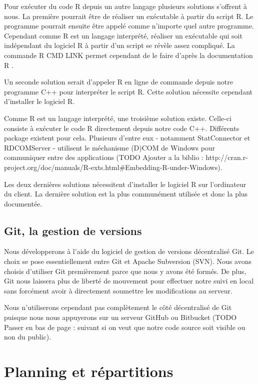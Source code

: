 	Pour exécuter du code R depuis un autre langage plusieurs solutions s’offrent à nous. La première pourrait être de réaliser un exécutable à partir du script R. Le programme pourrait ensuite être appelé comme n’importe quel autre programme. Cependant comme R est un langage interprété, réaliser un exécutable qui soit indépendant du logiciel R à partir d’un script se révèle assez compliqué. La commande R CMD LINK permet cependant de le faire d’après la documentation R \cite{website:R-LINK}.

	Un seconde solution serait d’appeler R en ligne de commande depuis notre programme C++ pour interpréter le script R. Cette solution nécessite cependant d’installer le logiciel R.

	Comme R est un langage interprété, une troisième solution existe. Celle-ci consiste à exécuter le code R directement depuis notre code C++. Différents package existent pour cela. Plusieurs d’entre eux - notamment StatConnector et RDCOMServer - utilisent le méchanisme (D)COM de Windows pour communiquer entre des applications (TODO Ajouter a la biblio : http://cran.r-project.org/doc/manuals/R-exts.html\#Embedding-R-under-Windows).

	Les deux dernières solutions nécessitent d’installer le logiciel R sur l’ordinateur du client. La dernière solution est la plus communément utilisée et donc la plus documentée. 


\subsection{Git, la gestion de versions}
	Nous développerons à l’aide du logiciel de gestion de versions décentralisé Git. Le choix se pose essentiellement entre Git et Apache Subversion (SVN). Nous avons choisis d’utiliser Git premièrement parce que nous y avons été formés. De plus, Git nous laissera plus de liberté de mouvement pour effectuer notre suivi en local sans forcément avoir à directement soumettre les modifications au serveur.

	Nous n’utiliserons cependant pas complètement le côté décentralisé de Git puisque nous nous appuyerons sur un serveur GitHub ou Bitbucket (TODO Passer en bas de page : suivant si on veut que notre code source soit visible ou non du public).


\section{Planning et répartitions}

